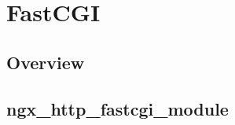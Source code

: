 \part{FastCGI}

\chapter{Overview}



\chapter{ngx\_http\_fastcgi\_module}



\begin{lstlisting}

\end{lstlisting}




\begin{lstlisting}

\end{lstlisting}




\begin{lstlisting}

\end{lstlisting}




\begin{lstlisting}

\end{lstlisting}





\begin{lstlisting}

\end{lstlisting}





\begin{lstlisting}

\end{lstlisting}





\begin{lstlisting}

\end{lstlisting}




\begin{lstlisting}

\end{lstlisting}








